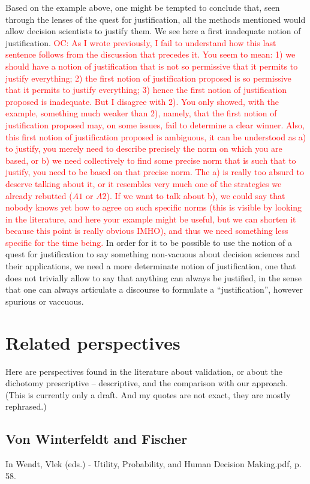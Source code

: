 \documentclass[preprint, french, english, 11pt, authoryear]{elsarticle}%
\newcommand{\commentOC}[1]{\textcolor{red}{OC: #1}}
\begin{document}
Based on the example above, one might be tempted to conclude that, seen through the lenses of the quest for justification, all the methods mentioned would allow decision scientists to justify them. We see here a first inadequate notion of justification. 
\commentOC{As I wrote previously, I fail to understand how this last sentence follows from the discussion that precedes it. You seem to mean: 1) we should have a notion of justification that is not so permissive that it permits to justify everything; 2) the first notion of justification proposed is so permissive that it permits to justify everything; 3) hence the first notion of justification proposed is inadequate. But I disagree with 2). You only showed, with the example, something much weaker than 2), namely, that the first notion of justification proposed may, on some issues, fail to determine a clear winner. Also, this first notion of justification proposed is ambiguous, it can be understood as a) to justify, you merely need to describe precisely the norm on which you are based, or b) we need collectively to find some precise norm that is such that to justify, you need to be based on that precise norm. The a) is really too absurd to deserve talking about it, or it resembles very much one of the strategies we already rebutted ($A1$ or $A2$). If we want to talk about b), we could say that nobody knows yet how to agree on such specific norms (this is visible by looking in the literature, and here your example might be useful, but we can shorten it because this point is really obvious IMHO), and thus we need something less specific for the time being.}
In order for it to be possible to use the notion of a quest for justification to say something non-vacuous about decision sciences and their applications, we need a more determinate notion of justification, one that does not trivially allow to say that anything can always be justified, in the sense that one can always articulate a discourse to formulate a ``justification'', however spurious or vaccuous.

\section{Related perspectives}
\label{sec-related}
Here are perspectives found in the literature about validation, or about the dichotomy prescriptive – descriptive, and the comparison with our approach. (This is currently only a draft. And my quotes are not exact, they are mostly rephrased.)

\subsection{Von Winterfeldt and Fischer}
In Wendt, Vlek (eds.) - Utility, Probability, and Human Decision Making.pdf, p. 58.
\end{document}
